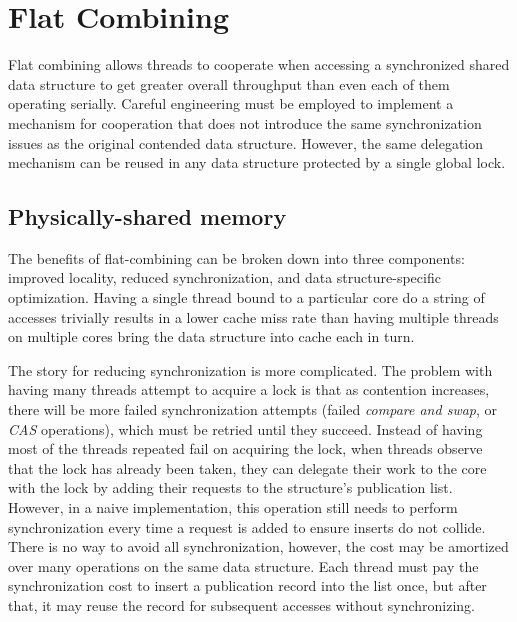 \section{Flat Combining}

Flat combining allows threads to cooperate when accessing a synchronized shared data structure to get greater overall throughput than even each of them operating serially. Careful engineering must be employed to implement a mechanism for cooperation that does not introduce the same synchronization issues as the original contended data structure. However, the same delegation mechanism can be reused in any data structure protected by a single global lock. 

\subsection{Physically-shared memory}

The benefits of flat-combining can be broken down into three components: improved locality, reduced synchronization, and data structure-specific optimization. Having a single thread bound to a particular core do a string of accesses trivially results in a lower cache miss rate than having multiple threads on multiple cores bring the data structure into cache each in turn.

The story for reducing synchronization is more complicated. The problem with having many threads attempt to acquire a lock is that as contention increases, there will be more failed synchronization attempts (failed \emph{compare and swap}, or \emph{CAS} operations), which must be retried until they succeed.
Instead of having most of the threads repeated fail on acquiring the lock, when threads observe that the lock has already been taken, they can delegate their work to the core with the lock by adding their requests to the structure's publication list. However, in a naive implementation, this operation still needs to perform synchronization every time a request is added to ensure inserts do not collide.
There is no way to avoid all synchronization, however, the cost may be amortized over many operations on the same data structure. Each thread must pay the synchronization cost to insert a publication record into the list once, but after that, it may reuse the record for subsequent accesses without synchronizing.

